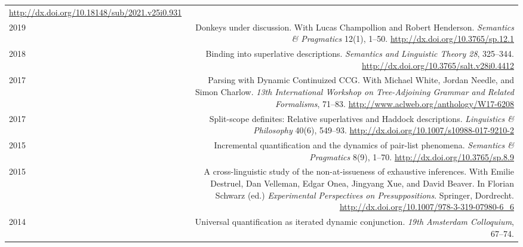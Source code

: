 \documentclass[12pt]{article}
\newcommand{\doi}[1]{\url{http://dx.doi.org/#1}}
\begin{document}
\begin{longtable}{LR}
          \doi{10.18148/sub/2021.v25i0.931}\\
  2019  & Donkeys under discussion.\newline
          With Lucas Champollion and Robert Henderson.\newline
          \textit{Semantics \& Pragmatics} 12(1), 1--50.\newline
          \doi{10.3765/sp.12.1}\\
  2018  & Binding into superlative descriptions.\newline
          \textit{Semantics and Linguistic Theory 28}, 325--344.\newline
          \doi{10.3765/salt.v28i0.4412}\\
  2017  & Parsing with Dynamic Continuized CCG.\newline
          With Michael White, Jordan Needle, and Simon Charlow.\newline
          \textit{13th International Workshop on Tree-Adjoining Grammar and
          Related Formalisms}, 71--83.\newline
          \url{http://www.aclweb.org/anthology/W17-6208}\\
  2017  & Split-scope definites: Relative superlatives and Haddock
          descriptions.\newline
          \textit{Linguistics \& Philosophy} 40(6), 549--93.\newline
          \doi{10.1007/s10988-017-9210-2}\\
  2015  & Incremental quantification and the dynamics of pair-list phenomena.\newline
          \textit{Semantics \& Pragmatics} 8(9), 1--70.\newline
          \doi{10.3765/sp.8.9}\\
  2015  & A cross-linguistic study of the non-at-issueness of exhaustive
          inferences.\newline
          With Emilie Destruel, Dan Velleman, Edgar Onea, Jingyang Xue, and
          David Beaver.\newline
          In Florian Schwarz (ed.) \textit{Experimental Perspectives on
          Presuppositions}. Springer, Dordrecht.\newline
          \doi{10.1007/978-3-319-07980-6_6}\\ %
  2014  & Universal quantification as iterated dynamic conjunction.\newline
          \textit{19th Amsterdam Colloquium}, 67--74.\newline

\end{longtable}
\end{document}
